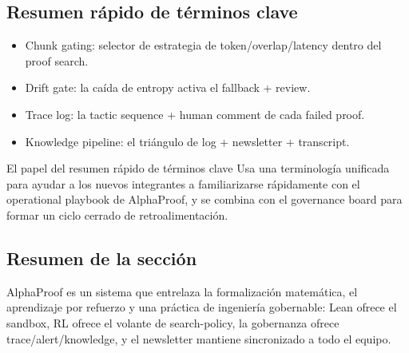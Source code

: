 \documentclass[a4paper]{article}
\begin{document}
\subsection{Resumen rápido de términos clave}
\begin{itemize}
    \item Chunk gating: selector de estrategia de token/overlap/latency dentro del proof search.
    \item Drift gate: la caída de entropy activa el fallback + review.
    \item Trace log: la tactic sequence + human comment de cada failed proof.
    \item Knowledge pipeline: el triángulo de log + newsletter + transcript.
\end{itemize}
\begin{knowledgebox}{El papel del resumen rápido de términos clave}
Usa una terminología unificada para ayudar a los nuevos integrantes a familiarizarse rápidamente con el operational playbook de AlphaProof, y se combina con el governance board para formar un ciclo cerrado de retroalimentación.
\end{knowledgebox}

\subsection{Resumen de la sección}
AlphaProof es un sistema que entrelaza la formalización matemática, el aprendizaje por refuerzo y una práctica de ingeniería gobernable: Lean ofrece el sandbox, RL ofrece el volante de search-policy, la gobernanza ofrece trace/alert/knowledge, y el newsletter mantiene sincronizado a todo el equipo.
\end{document}
